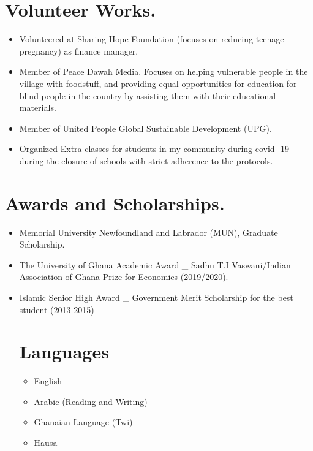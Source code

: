 \documentclass[
  letterpaper,
  DIV=11,
  numbers=noendperiod]{scrartcl}
\providecommand{\tightlist}{%
  \setlength{\itemsep}{0pt}\setlength{\parskip}{0pt}}\usepackage{longtable,booktabs,array}
\begin{document}
\hypertarget{volunteer-works.}{%
\section{Volunteer Works.}\label{volunteer-works.}}

\begin{itemize}
\item
  Volunteered at Sharing Hope Foundation (focuses on reducing teenage
  pregnancy) as finance manager.
\item
  Member of Peace Dawah Media. Focuses on helping vulnerable people in
  the village with foodstuff, and providing equal opportunities for
  education for blind people in the country by assisting them with their
  educational materials.
\item
  Member of United People Global Sustainable Development (UPG).
\item
  Organized Extra classes for students in my community during covid- 19
  during the closure of schools with strict adherence to the protocols.
\end{itemize}

\hypertarget{awards-and-scholarships.}{%
\section{Awards and Scholarships.}\label{awards-and-scholarships.}}

\begin{itemize}
\item
  Memorial University Newfoundland and Labrador (MUN), Graduate
  Scholarship.
\item
  The University of Ghana Academic Award \_ Sadhu T.I Vaswani/Indian
  Association of Ghana Prize for Economics (2019/2020).
\item
  Islamic Senior High Award \_ Government Merit Scholarship for the best
  student (2013-2015)

  \hypertarget{languages}{%
  \section{Languages}\label{languages}}

  \begin{itemize}
  \tightlist
  \item
    English
  \item
    Arabic (Reading and Writing)
  \item
    Ghanaian Language (Twi)
  \item
    Hausa
  \end{itemize}
\end{itemize}
\end{document}
